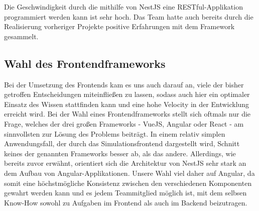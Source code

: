 Die Geschwindigkeit durch die mithilfe von NestJS eine RESTful-Applikation programmiert werden kann ist sehr hoch. Das Team hatte auch bereits durch die Realisierung vorheriger Projekte positive Erfahrungen mit dem Framework gesammelt.

\subsection*{Wahl des Frontendframeworks}
Bei der Umsetzung des Frontends kam es uns auch darauf an, viele der bisher getroffen Entscheidungen miteinfließen zu lassen, sodass auch hier ein optimaler Einsatz des Wissen stattfinden kann und eine hohe Velocity in der Entwicklung erreicht wird. Bei der Wahl eines Frontendframeworks stellt sich oftmals nur die Frage, welches der drei großen Frameworks - VueJS, Angular oder React - am sinnvollsten zur Lösung des Problems beiträgt. In einem relativ simplen Anwendungsfall, der durch das Simulationsfrontend dargestellt wird, Schnitt keines der genannten Frameworks besser ab, als das andere. Allerdings, wie bereits zuvor erwähnt, orientiert sich die Architektur von NestJS sehr stark an dem Aufbau von Angular-Applikationen. Unsere Wahl viel daher auf Angular, da somit eine höchstmögliche Konsistenz zwischen den verschiedenen Komponenten gewahrt werden kann und es jedem Teammitglied möglich ist, mit dem selbsen Know-How sowohl zu Aufgaben im Frontend als auch im Backend beizutragen.
